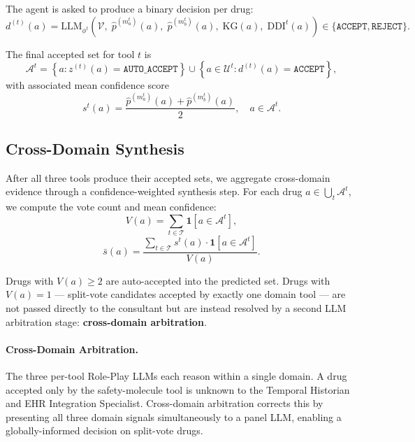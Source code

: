 \documentclass[sigconf,anonymous]{acmart}
\begin{document}
The agent is asked to produce a binary decision per drug:
\begin{equation}
d^{(t)}(a) = \text{LLM}_{\phi^t}\!\left(\mathcal{V},\; \hat{p}^{(m_a^t)}(a),\; \hat{p}^{(m_b^t)}(a),\; \text{KG}(a),\; \text{DDI}^t(a)\right) \in \{\texttt{ACCEPT}, \texttt{REJECT}\}.
\end{equation}

The final accepted set for tool $t$ is
\begin{equation}
\mathcal{A}^t = \left\{a : z^{(t)}(a) = \texttt{AUTO\_ACCEPT}\right\}
\cup \left\{a \in \mathcal{U}^t : d^{(t)}(a) = \texttt{ACCEPT}\right\},
\end{equation}
with associated mean confidence score
\begin{equation}
s^t(a) = \frac{\hat{p}^{(m_a^t)}(a) + \hat{p}^{(m_b^t)}(a)}{2}, \quad a \in \mathcal{A}^t.
\end{equation}

\subsection{Cross-Domain Synthesis}

After all three tools produce their accepted sets, we aggregate cross-domain evidence through a confidence-weighted synthesis step. For each drug $a \in \bigcup_t \mathcal{A}^t$, we compute the vote count and mean confidence:
\begin{equation}
V(a) = \sum_{t \in \mathcal{T}} \mathbf{1}[a \in \mathcal{A}^t],
\end{equation}
\begin{equation}
\bar{s}(a) = \frac{\displaystyle\sum_{t \in \mathcal{T}} s^t(a) \cdot \mathbf{1}[a \in \mathcal{A}^t]}{V(a)}.
\end{equation}

Drugs with $V(a) \geq 2$ are auto-accepted into the predicted set. Drugs with $V(a) = 1$ — split-vote candidates accepted by exactly one domain tool — are not passed directly to the consultant but are instead resolved by a second LLM arbitration stage: \textbf{cross-domain arbitration}.

\paragraph{Cross-Domain Arbitration.}
The three per-tool Role-Play LLMs each reason within a single domain. A drug accepted only by the safety-molecule tool is unknown to the Temporal Historian and EHR Integration Specialist. Cross-domain arbitration corrects this by presenting all three domain signals simultaneously to a panel LLM, enabling a globally-informed decision on split-vote drugs.
\end{document}
